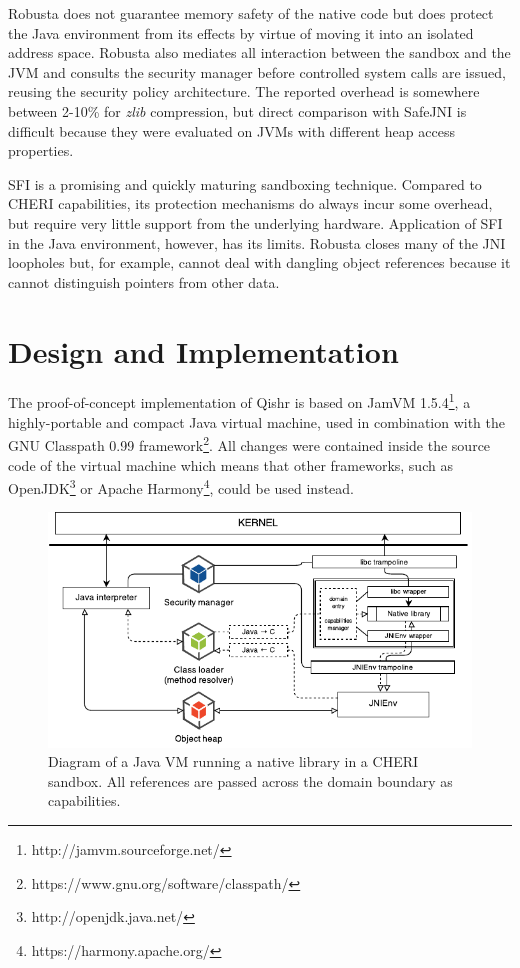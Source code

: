 \documentclass[a4paper,12pt,twoside,openright]{report}
\begin{document}
Robusta does not guarantee memory safety of the native code but does protect the Java environment from its effects by virtue of moving it into an isolated address space. Robusta also mediates all interaction between the sandbox and the JVM and consults the security manager before controlled system calls are issued, reusing the security policy architecture. The reported overhead is somewhere between 2-10\% for \emph{zlib} compression, but direct comparison with SafeJNI is difficult because they were evaluated on JVMs with different heap access properties.

\label{sec:Robusta}
SFI is a promising and quickly maturing sandboxing technique. Compared to CHERI capabilities, its protection mechanisms do always incur some overhead, but require very little support from the underlying hardware. Application of SFI in the Java environment, however, has its limits. Robusta closes many of the JNI loopholes but, for example, cannot deal with dangling object references because it cannot distinguish pointers from other data.

\chapter{Design and Implementation} 

The proof-of-concept implementation of Qishr is based on JamVM 1.5.4\footnote{http://jamvm.sourceforge.net/}, a highly-portable and compact Java virtual machine, used in combination with the GNU Classpath 0.99 framework\footnote{https://www.gnu.org/software/classpath/}. All changes were contained inside the source code of the virtual machine which means that other frameworks, such as OpenJDK\footnote{http://openjdk.java.net/} or Apache Harmony\footnote{https://harmony.apache.org/}, could be used instead.

\begin{figure}
	\includegraphics[width=\textwidth]{dia_jni_caps.pdf}
	\caption{Diagram of a Java VM running a native library in a CHERI sandbox. All references are passed across the domain boundary as capabilities.}
	\label{fig:OverviewCheriJNI}
\end{figure}
\end{document}
